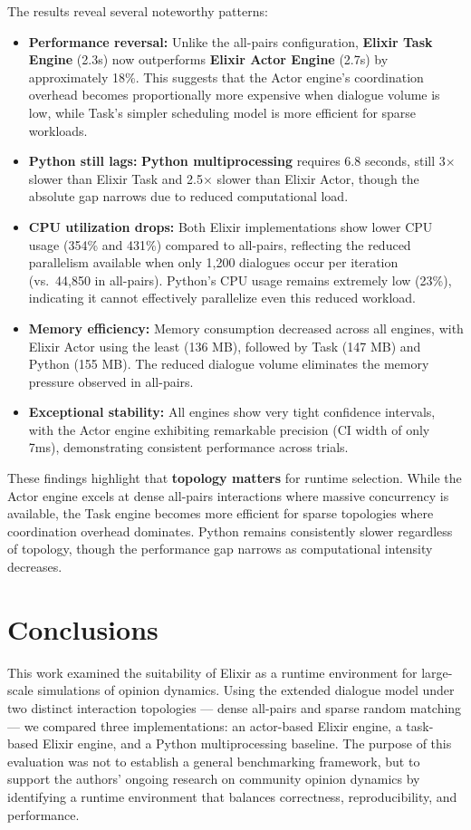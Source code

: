 \documentclass[
]{ceurart}
\begin{document}
The results reveal several noteworthy patterns:
\begin{itemize}
	\item \textbf{Performance reversal:} Unlike the all-pairs configuration, \textbf{Elixir Task Engine} (2.3s) now outperforms \textbf{Elixir Actor Engine} (2.7s) by approximately 18\%. This suggests that the Actor engine's coordination overhead becomes proportionally more expensive when dialogue volume is low, while Task's simpler scheduling model is more efficient for sparse workloads.
	\item \textbf{Python still lags:} \textbf{Python multiprocessing} requires 6.8 seconds, still 3$\times$ slower than Elixir Task and 2.5$\times$ slower than Elixir Actor, though the absolute gap narrows due to reduced computational load.
	\item \textbf{CPU utilization drops:} Both Elixir implementations show lower CPU usage (354\% and 431\%) compared to all-pairs, reflecting the reduced parallelism available when only 1,200 dialogues occur per iteration (vs.\ 44,850 in all-pairs). Python's CPU usage remains extremely low (23\%), indicating it cannot effectively parallelize even this reduced workload.
	\item \textbf{Memory efficiency:} Memory consumption decreased across all engines, with Elixir Actor using the least (136 MB), followed by Task (147 MB) and Python (155 MB). The reduced dialogue volume eliminates the memory pressure observed in all-pairs.
	\item \textbf{Exceptional stability:} All engines show very tight confidence intervals, with the Actor engine exhibiting remarkable precision (CI width of only 7ms), demonstrating consistent performance across trials.
\end{itemize}

These findings highlight that \textbf{topology matters} for runtime selection. While the Actor engine excels at dense all-pairs interactions where massive concurrency is available, the Task engine becomes more efficient for sparse topologies where coordination overhead dominates. Python remains consistently slower regardless of topology, though the performance gap narrows as computational intensity decreases.


\section{Conclusions}

This work examined the suitability of Elixir as a runtime environment for large-scale simulations of opinion dynamics. Using the extended dialogue model under two distinct interaction topologies --- dense all-pairs and sparse random matching --- we compared three implementations: an actor-based Elixir engine, a task-based Elixir engine, and a Python multiprocessing baseline. The purpose of this evaluation was not to establish a general benchmarking framework, but to support the authors' ongoing research on community opinion dynamics by identifying a runtime environment that balances correctness, reproducibility, and performance.
\end{document}
